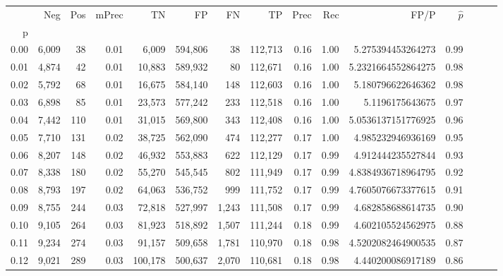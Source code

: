 \begin{tabular}{rrrrrrrrrrrrrrr}
\toprule
{} &    Neg &    Pos & mPrec &       TN &       FP &       FN &       TP &  Prec &   Rec &                  FP/P & $\hat{p}$ \\
p    &        &        &       &          &          &          &          &       &       &                       &           \\
\midrule
0.00 &  6,009 &     38 &  0.01 &    6,009 &  594,806 &       38 &  112,713 &  0.16 &  1.00 &     5.275394453264273 &      0.99 \\
0.01 &  4,874 &     42 &  0.01 &   10,883 &  589,932 &       80 &  112,671 &  0.16 &  1.00 &    5.2321664552864275 &      0.98 \\
0.02 &  5,792 &     68 &  0.01 &   16,675 &  584,140 &      148 &  112,603 &  0.16 &  1.00 &     5.180796622646362 &      0.98 \\
0.03 &  6,898 &     85 &  0.01 &   23,573 &  577,242 &      233 &  112,518 &  0.16 &  1.00 &       5.1196175643675 &      0.97 \\
0.04 &  7,442 &    110 &  0.01 &   31,015 &  569,800 &      343 &  112,408 &  0.16 &  1.00 &    5.0536137151776925 &      0.96 \\
0.05 &  7,710 &    131 &  0.02 &   38,725 &  562,090 &      474 &  112,277 &  0.17 &  1.00 &     4.985232946936169 &      0.95 \\
0.06 &  8,207 &    148 &  0.02 &   46,932 &  553,883 &      622 &  112,129 &  0.17 &  0.99 &     4.912444235527844 &      0.93 \\
0.07 &  8,338 &    180 &  0.02 &   55,270 &  545,545 &      802 &  111,949 &  0.17 &  0.99 &    4.8384936718964795 &      0.92 \\
0.08 &  8,793 &    197 &  0.02 &   64,063 &  536,752 &      999 &  111,752 &  0.17 &  0.99 &    4.7605076673377615 &      0.91 \\
0.09 &  8,755 &    244 &  0.03 &   72,818 &  527,997 &    1,243 &  111,508 &  0.17 &  0.99 &     4.682858688614735 &      0.90 \\
0.10 &  9,105 &    264 &  0.03 &   81,923 &  518,892 &    1,507 &  111,244 &  0.18 &  0.99 &     4.602105524562975 &      0.88 \\
0.11 &  9,234 &    274 &  0.03 &   91,157 &  509,658 &    1,781 &  110,970 &  0.18 &  0.98 &    4.5202082464900535 &      0.87 \\
0.12 &  9,021 &    289 &  0.03 &  100,178 &  500,637 &    2,070 &  110,681 &  0.18 &  0.98 &     4.440200086917189 &      0.86 \\

\end{tabular}
